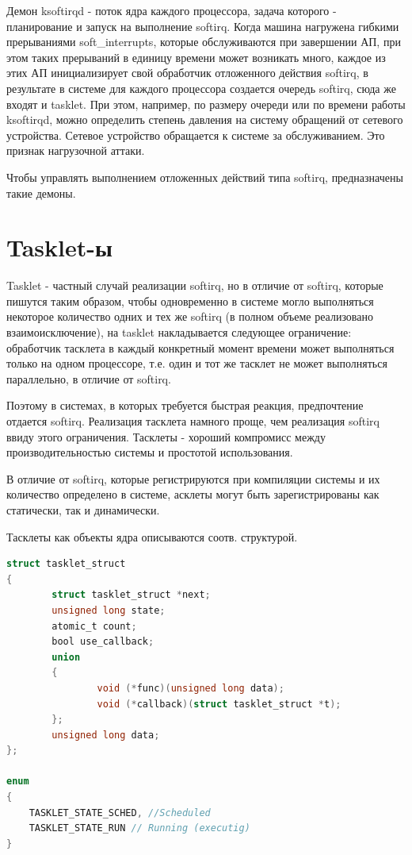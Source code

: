 \documentclass[12pt,a4paper]{scrreprt}
\begin{document}
Демон ksoftirqd - поток ядра каждого процессора, задача которого - планирование и запуск на выполнение softirq. Когда машина нагружена гибкими прерываниями soft\_interrupts, которые обслуживаются при завершении АП, при этом таких прерываний в единицу времени может возникать много, каждое из этих АП инициализирует свой обработчик отложенного действия softirq, в результате в системе для каждого процессора создается очередь softirq, сюда же входят и tasklet. При этом, например, по размеру очереди или по времени работы ksoftirqd, можно определить степень давления на систему обращений от сетевого устройства. Сетевое устройство обращается к системе за обслуживанием. Это признак нагрузочной аттаки.

Чтобы управлять выполнением отложенных действий типа softirq, предназначены такие демоны.

\section{Tasklet-ы}

Tasklet - частный случай реализации softirq, но в отличие от softirq, которые пишутся таким образом, чтобы одновременно в системе могло выполняться некоторое количество одних и тех же softirq (в полном объеме реализовано взаимоисключение), на tasklet накладывается следующее ограничение: обработчик тасклета в каждый конкретный момент времени может выполняться только на одном процессоре, т.е. один и тот же тасклет не может выполняться параллельно, в отличие от softirq.

Поэтому в системах, в которых требуется быстрая реакция, предпочтение отдается softirq. Реализация тасклета намного проще, чем реализация softirq ввиду этого ограничения. Тасклеты - хороший компромисс между производительностью системы и простотой использования. 

В отличие от softirq, которые регистрируются при компиляции системы и их количество определено в системе, асклеты могут быть зарегистрированы как статически, так и динамически.

Тасклеты как объекты ядра описываются соотв. структурой.

\begin{lstlisting}[language=C]
struct tasklet_struct 
{
		struct tasklet_struct *next;
		unsigned long state;
		atomic_t count;
		bool use_callback;
		union 
		{
				void (*func)(unsigned long data);
				void (*callback)(struct tasklet_struct *t);
		};
		unsigned long data;
};

enum 
{
	TASKLET_STATE_SCHED, //Scheduled
	TASKLET_STATE_RUN // Running (executig)
}
\end{lstlisting}
\end{document}
